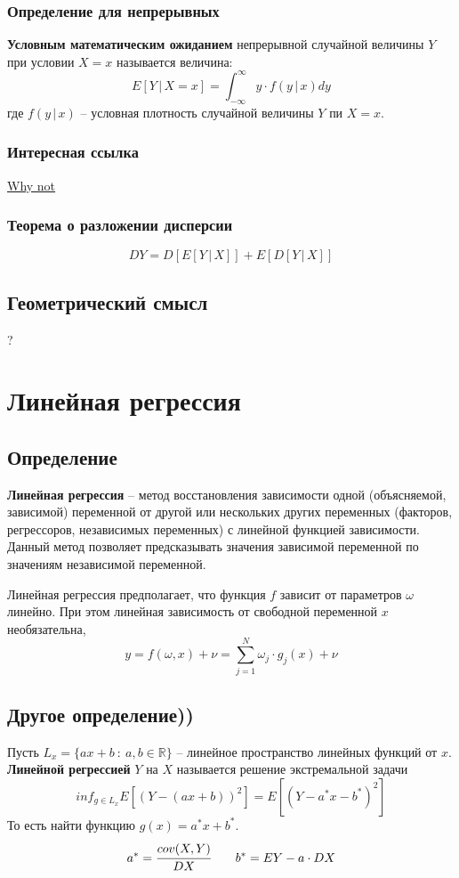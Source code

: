 \documentclass{article}
\newcommand{\R}{\mathbb{R}}
\begin{document}
\subsubsection{Определение для непрерывных}
\textbf{Условным математическим ожиданием} непрерывной случайной величины $Y$ при условии $X=x$ называется величина:
$$ E[Y\,|\,X=x]=\int_{-\infty}^{\infty} y\cdot f(y\,|\,x)dy $$
где $f(y\,|\,x)$ -- условная плотность случайной величины $Y$ пи $X=x$.

\subsubsection{Интересная ссылка}
\href{https://eduardgorbunov.github.io/assets/files/Seminar07_675.pdf}{Why not}
\subsubsection{Теорема о разложении дисперсии}
$$ DY=D[E[Y\,|\,X]]+E[D[Y\,|\,X]] $$
\subsection{Геометрический смысл}
?
\newpage
\section{Линейная регрессия}
\subsection{Определение}
\textbf{Линейная регрессия} -- метод восстановления зависимости одной (объясняемой, зависимой) переменной от другой или нескольких других переменных (факторов, регрессоров, независимых переменных) с линейной функцией зависимости. Данный метод позволяет предсказывать значения зависимой переменной по значениям независимой переменной.

Линейная регрессия предполагает, что функция $f$ зависит от параметров $\omega$ линейно. При этом линейная зависимость от свободной переменной $x$ необязательна,
$$ y=f(\omega,x)+\nu=\sum_{j=1}^N \omega_j\cdot g_j(x)+\nu $$
\subsection{Другое определение))}
Пусть $L_x=\{ax+b\::\:a,b\in\R\}$ -- линейное пространство линейных функций от $x$. \textbf{Линейной регрессией} $Y$ на $X$ называется решение экстремальной задачи $$ inf_{g\in L_x} E[(Y-(ax+b))^2]=E[(Y-a^*x-b^*)^2] $$
То есть найти функцию $g(x)=a^* x+b^*$.
$$ a^*=\cfrac{cov(X,Y)}{DX} \quad\quad b^*=EY-a\cdot DX $$
\newpage
\end{document}
